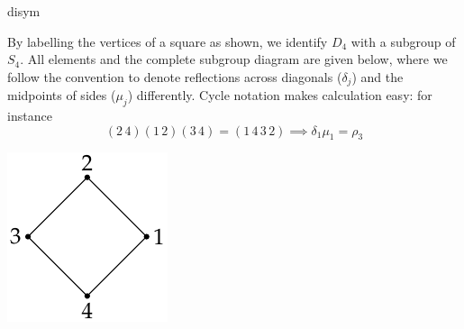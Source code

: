 \begin{examples}{}{disym}
\begin{enumerate}
\begin{minipage}[t]{0.77\linewidth}\vspace{0pt}
	\item By labelling the vertices of a square as shown, we identify $D_4$ with a subgroup of $S_4$. All elements and the complete subgroup diagram are given below, where we follow the convention to denote reflections across diagonals ($\delta_j$) and the midpoints of sides ($\mu_j$) differently.\smallbreak
	Cycle notation makes calculation easy: for instance
	\[(2\,4)(1\,2)(3\,4)=(1\,4\,3\,2)\implies \delta_1\mu_1=\rho_3\]
\end{minipage}\hfill\begin{minipage}[t]{0.22\linewidth}\vspace{0pt}
\flushright\includegraphics{perm-d4}
\end{minipage}\smallbreak




\end{enumerate}
\end{examples}
